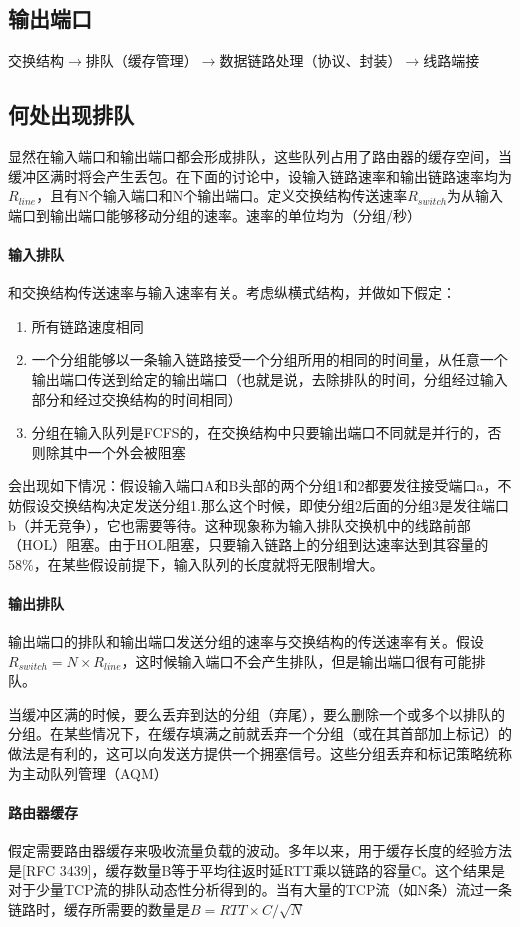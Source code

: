 \documentclass[]{report}
\begin{document}
		\subsection{输出端口}
		交换结构$\to$排队（缓存管理）$\to$数据链路处理（协议、封装）$\to$线路端接
		\subsection{何处出现排队}
		显然在输入端口和输出端口都会形成排队，这些队列占用了路由器的缓存空间，当缓冲区满时将会产生丢包。在下面的讨论中，设输入链路速率和输出链路速率均为$R_{line}$，且有N个输入端口和N个输出端口。定义交换结构传送速率$R_{switch}$为从输入端口到输出端口能够移动分组的速率。速率的单位均为（分组/秒）
			\paragraph{输入排队}
			和交换结构传送速率与输入速率有关。考虑纵横式结构，并做如下假定：
			\begin{enumerate}
				\item 所有链路速度相同
				\item 一个分组能够以一条输入链路接受一个分组所用的相同的时间量，从任意一个输出端口传送到给定的输出端口（也就是说，去除排队的时间，分组经过输入部分和经过交换结构的时间相同）
				\item 分组在输入队列是FCFS的，在交换结构中只要输出端口不同就是并行的，否则除其中一个外会被阻塞
			\end{enumerate}
			会出现如下情况：假设输入端口A和B头部的两个分组1和2都要发往接受端口a，不妨假设交换结构决定发送分组1.那么这个时候，即使分组2后面的分组3是发往端口b（并无竞争），它也需要等待。这种现象称为输入排队交换机中的线路前部（HOL）阻塞。由于HOL阻塞，只要输入链路上的分组到达速率达到其容量的58\%，在某些假设前提下，输入队列的长度就将无限制增大。
			\paragraph{输出排队}
			输出端口的排队和输出端口发送分组的速率与交换结构的传送速率有关。假设$R_{switch}=N\times R_{line}$，这时候输入端口不会产生排队，但是输出端口很有可能排队。\par
			当缓冲区满的时候，要么丢弃到达的分组（弃尾），要么删除一个或多个以排队的分组。在某些情况下，在缓存填满之前就丢弃一个分组（或在其首部加上标记）的做法是有利的，这可以向发送方提供一个拥塞信号。这些分组丢弃和标记策略统称为主动队列管理（AQM）
			\paragraph{路由器缓存}
			假定需要路由器缓存来吸收流量负载的波动。多年以来，用于缓存长度的经验方法是[RFC 3439]，缓存数量B等于平均往返时延RTT乘以链路的容量C。这个结果是对于少量TCP流的排队动态性分析得到的。当有大量的TCP流（如N条）流过一条链路时，缓存所需要的数量是$B=RTT\times C/\sqrt{N}$
\end{document}
